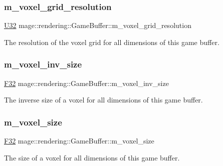 \subsubsection{\texorpdfstring{m\+\_\+voxel\+\_\+grid\+\_\+resolution}{m\_voxel\_grid\_resolution}}
{\footnotesize\ttfamily \hyperlink{namespacemage_a41c104c036fba3756a74e19f793eeaa1}{U32} mage\+::rendering\+::\+Game\+Buffer\+::m\+\_\+voxel\+\_\+grid\+\_\+resolution}

The resolution of the voxel grid for all dimensions of this game buffer. \hypertarget{structmage_1_1rendering_1_1_game_buffer_add22463d853cd1b33c605257d44bec07}{}\label{structmage_1_1rendering_1_1_game_buffer_add22463d853cd1b33c605257d44bec07} 
\subsubsection{\texorpdfstring{m\+\_\+voxel\+\_\+inv\+\_\+size}{m\_voxel\_inv\_size}}
{\footnotesize\ttfamily \hyperlink{namespacemage_aa97e833b45f06d60a0a9c4fc22ae02c0}{F32} mage\+::rendering\+::\+Game\+Buffer\+::m\+\_\+voxel\+\_\+inv\+\_\+size}

The inverse size of a voxel for all dimensions of this game buffer. \hypertarget{structmage_1_1rendering_1_1_game_buffer_a792ab7eca88d2a2f425d06df602d6e11}{}\label{structmage_1_1rendering_1_1_game_buffer_a792ab7eca88d2a2f425d06df602d6e11} 
\subsubsection{\texorpdfstring{m\+\_\+voxel\+\_\+size}{m\_voxel\_size}}
{\footnotesize\ttfamily \hyperlink{namespacemage_aa97e833b45f06d60a0a9c4fc22ae02c0}{F32} mage\+::rendering\+::\+Game\+Buffer\+::m\+\_\+voxel\+\_\+size}

The size of a voxel for all dimensions of this game buffer. 